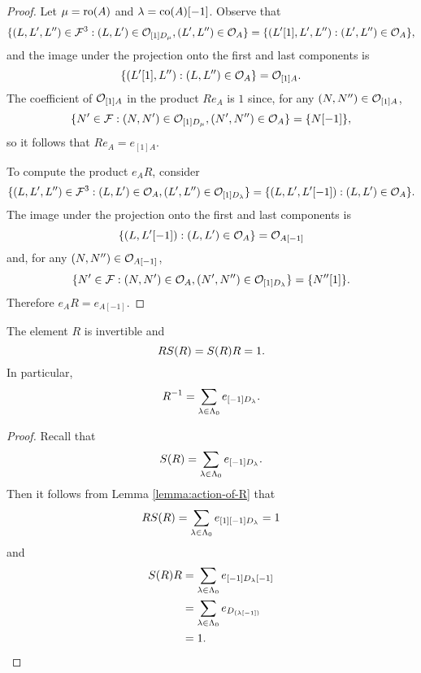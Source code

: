 \documentclass[a4paper, 11pt]{report}
\begin{document}
\begin{proof}
Let $\mu = \operatorname{ro}(A)$ and $\lambda=\operatorname{co}(A)[-1]$. Observe that
\begin{equation*}
\{(L,L',L'')\in\mathcal{F}^3: (L,L')\in\mathcal{O}_{[1]D_{\mu}}, (L',L'')\in\mathcal{O}_{A}\} = \{(L'[1],L',L''): (L',L'')\in\mathcal{O}_{A}\},
\end{equation*}
and the image under the projection onto the first and last components is
\begin{equation*}
\{(L'[1],L''):(L,L'')\in\mathcal{O}_{A}\} = \mathcal{O}_{[1]A}.
\end{equation*}
The coefficient of $\mathcal{O}_{[1]A}$ in the product $Re_A$ is $1$ since, for any $(N,N'')\in\mathcal{O}_{[1]A}$,
\begin{equation*}
\{N'\in\mathcal{F}: (N,N')\in\mathcal{O}_{[1]D_{\mu}}, (N',N'')\in\mathcal{O}_{A}\} = \{N[-1]\},
\end{equation*}
so it follows that $Re_A = e_{[1]A}$.

To compute the product $e_A R$, consider
\begin{equation*}
\{(L,L',L'')\in\mathcal{F}^3: (L,L')\in\mathcal{O}_{A}, (L',L'')\in\mathcal{O}_{[1]D_{\lambda}}\} = \{(L,L',L'[-1]):(L,L')\in\mathcal{O}_{A}\}.
\end{equation*}
The image under the projection onto the first and last components is
\begin{equation*}
\{(L,L'[-1]):(L,L')\in\mathcal{O}_{A}\} = \mathcal{O}_{A[-1]}
\end{equation*}
and, for any $(N,N'')\in\mathcal{O}_{A[-1]}$,
\begin{equation*}
\{N'\in\mathcal{F}:(N,N')\in\mathcal{O}_{A}, (N',N'')\in\mathcal{O}_{[1]D_{\lambda}}\} = \{N''[1]\}.
\end{equation*}
Therefore $e_A R = e_{A[-1]}$.
\end{proof}

\begin{lemma}\label{lemma:R-is-a-unit}
The element $R$ is invertible and
\begin{equation*}
R S{(R)} = S{(R)} R = 1.
\end{equation*}
In particular,
\begin{equation*}
R^{-1} = \sum_{\lambda\in\Lambda_0{}} e_{[-1]D_{\lambda}}.
\end{equation*}
\end{lemma}

\begin{proof}
Recall that
\begin{equation*}
S{(R)} = \sum_{\lambda\in\Lambda_0{}} e_{[-1]D_{\lambda}}.
\end{equation*}
Then it follows from Lemma \ref{lemma:action-of-R} that
\begin{equation*}
RS{(R)} = \sum_{\lambda\in\Lambda_0{}}e_{[1][-1]D_{\lambda}} = 1
\end{equation*}
and
\begin{align*}
S{(R)} R
&= \sum_{\lambda\in\Lambda_0{}} e_{[-1]D_{\lambda}[-1]}\\
&= \sum_{\lambda\in\Lambda_0{}} e_{D_{(\lambda[-1])}}\\
&= 1.
\end{align*}
\end{proof}
\end{document}
